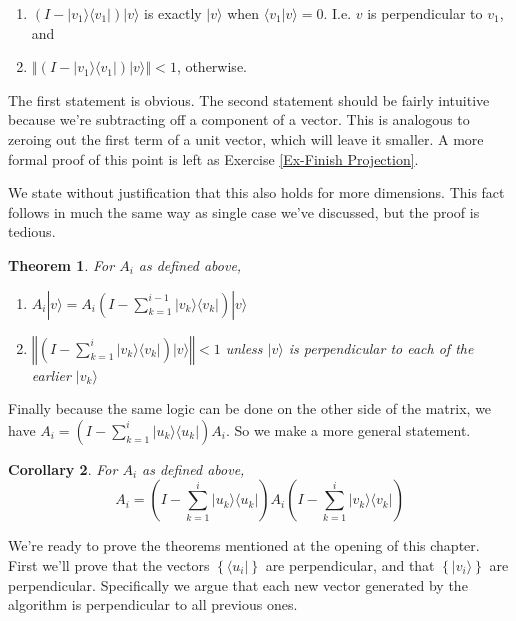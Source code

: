 \documentclass{amsbook}
\newtheorem{theorem}{Theorem}
\newtheorem{corollary}[theorem]{Corollary}
\begin{document}
\begin{enumerate}
\item  $\left(I-| v _1\rangle\langle v _1|\right)| v \rangle$ is exactly $| v \rangle$ when $\langle v _1| v \rangle=0$.  I.e. $ v $ is perpendicular to $ v _1$, and 
\item  $\left\Vert\left(I-| v _1\rangle\langle v _1|\right)| v \rangle\right\Vert < 1$, otherwise.
\end{enumerate}

The first statement is obvious.  The second statement should be fairly intuitive because we're subtracting off a component of a vector.  This is analogous to zeroing out the first term of a unit vector, which will leave it smaller.  A more formal proof of this point is left as Exercise \ref{Ex-Finish Projection}.

We state without justification that this also holds for more dimensions.  This fact follows in much the same way as single case we've discussed, but the proof is tedious.

 \begin{theorem}
\label{AiProjectionThm}
For $A_i$ as defined above,
\begin{enumerate}
\item $A_i| v \rangle=A_i\left(I-\sum_{k=1}^{i-1}| v _k\rangle\langle v _k|\right)| v \rangle$
\item $\left\Vert\left(I-\sum_{k=1}^{i}| v _k\rangle\langle v _k|\right)| v \rangle\right\Vert<1$ unless $| v \rangle$ is perpendicular to each of the earlier $| v _k\rangle$
\end{enumerate}
 \end{theorem}

Finally because the same logic can be done on the other side of the matrix, we have $A_i=\left(I-\sum_{k=1}^i| u _k\rangle\langle u _k|\right)A_i$.  So we make a more general statement.

\begin{corollary}
\label{DoubleSidedProjectionThm}
For $A_i$ as defined above,
$$
A_i=\left(I-\sum_{k=1}^i| u _k\rangle\langle u _k|\right)A_i\left(I-\sum_{k=1}^{i}| v _k\rangle\langle v _k|\right)
$$
\end{corollary}

We're ready to prove the theorems mentioned at the opening of this chapter.  First we'll prove that the vectors $\left\{\langle u_i|\right\}$ are perpendicular, and that $\left\{|v_i\rangle\right\}$ are perpendicular.  Specifically we argue that each new vector generated by the algorithm is perpendicular to all previous ones.
\end{document}
